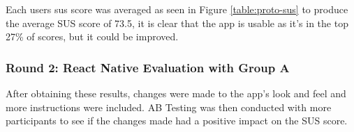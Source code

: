 Each users sus score was averaged as seen in Figure \ref{table:proto-sus} to produce the average SUS score of 73.5, it is clear that the app is usable as it's in the top 27\% of scores, but it could be improved.

\subsubsection{Round 2: React Native Evaluation with Group A}

After obtaining these results, changes were made to the app's look and feel and more instructions were included. AB Testing was then conducted with more participants to see if the changes made had a positive impact on the SUS score. 

\begin{table}[]
    \caption{Round 2 SUS Results for Group A React Native App}
    \label{table:grp-a-sus}
\end{table}
